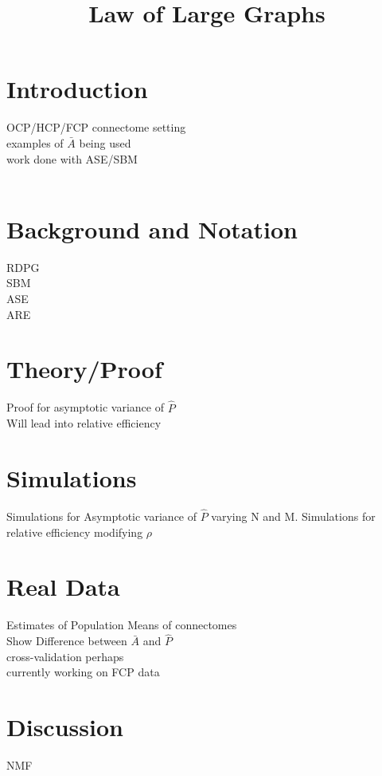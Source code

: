 \documentclass[10pt]{article}
\title{Law of Large Graphs}
\author{}
\date{}
\begin{document}
	\large
	\maketitle
	\thispagestyle{headings}
	
	\vspace{-.5in}
	\section{Introduction}
	OCP/HCP/FCP connectome setting\\
	examples of $\bar{A}$ being used\\
	work done with ASE/SBM\\
	\cite{Athreya2013}
	\cite{Cerqueira2015}
	\cite{Fishkind2012}
	\cite{Freer2014}\\
	\cite{Oliveira2009}
	
	\section{Background and Notation}
	
	RDPG\\
	SBM\\
	ASE\\
	ARE\\
		\cite{Lyzinski2000}
		\cite{Scheinerman2010}
	\section{Theory/Proof}
	
	Proof for asymptotic variance of $\hat{P}$\\
	Will lead into relative efficiency
	\cite{Brown1977}
	\section{Simulations}
	Simulations for Asymptotic variance of $\hat{P}$ varying N and M.
	Simulations for relative efficiency modifying $\rho$
	\section{Real Data}
	Estimates of Population Means of connectomes\\
	Show Difference between $\bar{A}$ and $\hat{P}$\\
	cross-validation perhaps\\
	currently working on FCP data\\
	\section{Discussion}
	\cite{Ho2008}
	NMF
	{}
	
\end{document}
